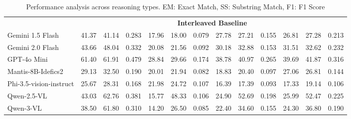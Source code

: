 \documentclass[11pt]{article}
\begin{document}
\begin{table}[h]
\begin{tabular}{lccc|ccc|ccc|ccc}
\cmidrule{2-13}
& \multicolumn{12}{c}{\textbf{Interleaved Baseline}} \\
\cmidrule{2-13}
Gemini 1.5 Flash & 41.37 & 41.14 & 0.283 & 17.96 & 18.00 & 0.079 & 27.78 & 27.21 & 0.155 & 26.81 & 27.28 & 0.213 \\
Gemini 2.0 Flash & 43.66 & 48.04 & 0.332 & 20.08 & 21.56 & 0.092 & 30.18 & 32.88 & 0.153 & 31.51 & 32.62 & 0.232 \\
GPT-4o Mini     & \cellcolor{yellow}61.40 & 61.91 & \cellcolor{yellow}0.479 & \cellcolor{yellow}28.84 & 29.66 & \cellcolor{yellow}0.174 & \cellcolor{yellow}38.78 & 40.97 & \cellcolor{yellow}0.265 & \cellcolor{yellow}39.69 & 41.87 & \cellcolor{yellow}0.316 \\
Mantis-8B-Idefics2 & 29.13 & 32.50 & 0.190 & 20.01 & 21.94 & 0.082 & 18.83 & 20.40 & 0.097 & 27.06 & 26.81 & 0.144 \\
Phi-3.5-vision-instruct & 25.67 & 28.31 & 0.168 & 21.98 & 24.72 & 0.107 & 16.39 & 17.39 & 0.093 & 17.33 & 19.14 & 0.106 \\
Qwen-2.5-VL & 43.03 & \cellcolor{yellow}62.76 & 0.381 & 15.77 & \cellcolor{yellow}48.33 & 0.106 & 24.90 & \cellcolor{yellow}52.69 & 0.198 & 25.99 & \cellcolor{yellow}52.47 & 0.225 \\
Qwen-3-VL & 38.50 & 61.80 & 0.310 & 14.20 & 26.50 & 0.085 & 22.40 & 34.60 & 0.155 & 24.30 & 36.80 & 0.190 \\
\bottomrule
\end{tabular}
\vspace{-0.5em}
\caption{Performance analysis across reasoning types. EM: Exact Match, SS: Substring Match, F1: F1 Score}
\label{tab:reasoning_types_results}
\vspace{-0.5em}
\end{table}
\end{document}
